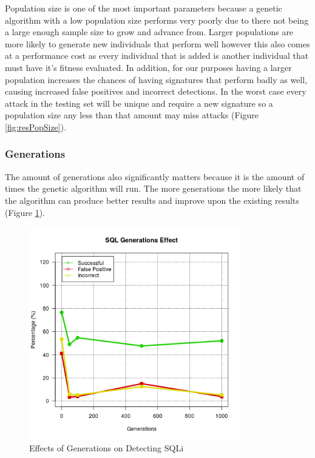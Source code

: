 Population size is one of the most important parameters because a genetic algorithm with a low population size performs very poorly due to there not being a large enough sample size to grow and advance from.  Larger populations are more likely to generate new individuals that perform well however this also comes at a performance cost as every individual that is added is another individual that must have it's fitness evaluated.\cite{optimizationOfControlParameters}  In addition, for our purposes having a larger population increases the chances of having signatures that perform badly as well, causing increased false positives and incorrect detections.  In the worst case every attack in the testing set will be unique and require a new signature so a population size any less than that amount may miss attacks (Figure \ref{fig:resPopSize}).

\subsubsection{Generations}

The amount of generations also significantly matters because it is the amount of times the genetic algorithm will run.  The more generations the more likely that the algorithm can produce better results and improve upon the existing results (Figure \ref{fig:resGenerations}).

\begin{figure}[hb]
	\centering
	\includegraphics[width=350px]{./assets/results/ga/generations/Results_SQL.png}
	\caption{Effects of Generations on Detecting SQLi}
	\label{fig:resGenerations}
\end{figure}

